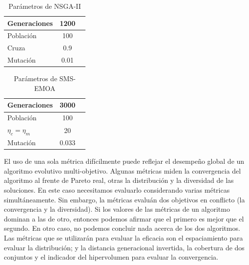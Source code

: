 \begin{minipage}{0.5\textwidth}
\begin{table}[H]
  \begin{center}
    \begin{tabular}{|l||c|c}
	\hline
	Generaciones  & 1200 \\ 
	\hline
	Poblaci\'on & 100 \\ 
	\hline
	Cruza & 0.9 \\
	\hline
	Mutaci\'on & 0.01 \\
	\hline
  \end{tabular}
  \caption{Par\'ametros de NSGA-II}
  \label{tab:parametros2}
\end{center}
\end{table}
\end{minipage}
\begin{minipage}{0.5\textwidth}
\begin{table}[H]
	\begin{center}
		\begin{tabular}{|l||c|c}
			\hline
			Generaciones  & 3000 \\ 
			\hline
			Poblaci\'on & 100 \\ 
			\hline
			$\eta_c = \eta_m$ & 20 \\ 
			\hline
			Mutaci\'on & 0.033\\ 
			\hline			
		\end{tabular}
		\caption{Par\'ametros de SMS-EMOA}
		\label{tab:parametros3}
	\end{center}
\end{table}
\end{minipage}

El uso de una sola m\'etrica dif\'icilmente puede reflejar el desempe\~no global de un algoritmo evolutivo multi-objetivo. Algunas
m\'etricas miden la convergencia del algoritmo al frente de Pareto real, otras la distribuci\'on y la diversidad de las soluciones. 
En este caso necesitamos evaluarlo considerando varias m\'etricas simult\'aneamente. Sin embargo, la m\'etricas evalu\'an dos 
objetivos en conflicto (la convergencia y la diversidad). Si los valores de las m\'etricas de un algoritmo dominan a las de otro,
entonces podemos afirmar que el primero es mejor que el segundo. En otro caso, no podemos concluir nada acerca de los dos algoritmos.
Las m\'etricas que se utilizar\'an para evaluar la eficacia son el espaciamiento para evaluar la distribuci\'on; y la distancia generacional 
invertida, la cobertura de dos conjuntos y el indicador del hipervolumen para evaluar la convergencia.


